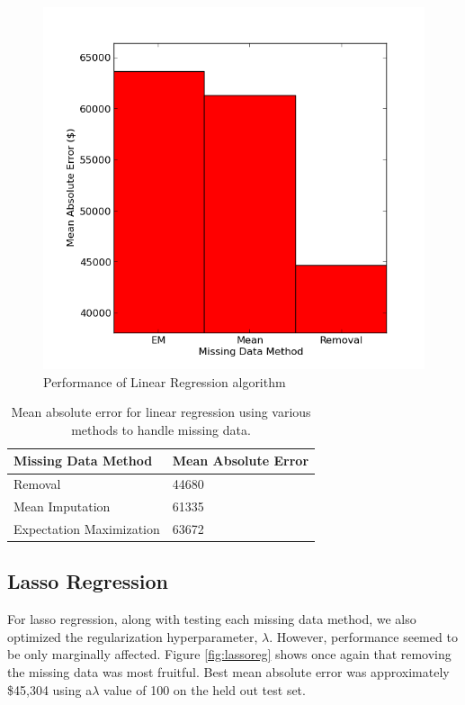 \documentclass{acm_proc_article-sp}
\begin{document}
	 \begin{figure}[!htbp]
   		\centering
  		\includegraphics[width=\linewidth]{linear_regression_tuning.png}
    		\caption{Performance of Linear Regression algorithm}
    		\label{fig:linreg}
	\end{figure}
	\begin{center}
	
    \begin{table}	
    \begin{tabular}{| l | l |}
    \hline
    Missing Data Method & Mean Absolute Error \\ \hline
    \hline
    Removal & 44680 \\
    \hline
    Mean Imputation & 61335 \\
    \hline
    Expectation Maximization & 63672 \\
    \hline
    \end{tabular}
    \caption{Mean absolute error for linear regression using various methods to handle missing data.}
    \label{fig:linregres}
    \end{table}
\end{center}
\subsection{Lasso Regression}
	For lasso regression, along with testing each missing data method, we also optimized the regularization hyperparameter, $\lambda$. However, performance seemed to be only marginally affected. Figure \ref{fig:lassoreg} shows once again that removing the missing data was most fruitful. Best mean absolute error was approximately \$45,304 using a$ \lambda$ value of 100 on the held out test set.
	
\end{document}
